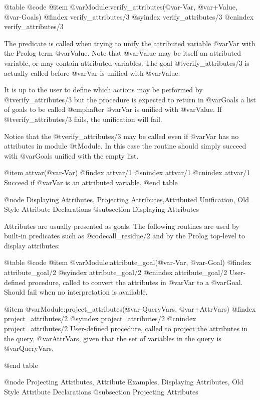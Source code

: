 {{{{{{{{@table @code
@item @var{Module}:verify_attributes(@var{-Var}, @var{+Value}, @var{-Goals})
@findex verify_attributes/3
@syindex verify_attributes/3
@cnindex verify_attributes/3

The predicate is called when trying to unify the attributed variable
@var{Var} with the Prolog term @var{Value}. Note that @var{Value} may be
itself an attributed variable, or may contain attributed variables.  The
goal @t{verify_attributes/3} is actually called before @var{Var} is
unified with @var{Value}.

It is up to the user to define which actions may be performed by
@t{verify_attributes/3} but the procedure is expected to return in
@var{Goals} a list of goals to be called @emph{after} @var{Var} is
unified with @var{Value}. If @t{verify_attributes/3} fails, the
unification will fail.

Notice that the @t{verify_attributes/3} may be called even if @var{Var}
has no attributes in module @t{Module}. In this case the routine should
simply succeed with @var{Goals} unified with the empty list.

@item attvar(@var{-Var})
@findex attvar/1
@snindex attvar/1
@cnindex attvar/1
Succeed if @var{Var} is an attributed variable.
@end table



@node Displaying Attributes, Projecting Attributes,Attributed Unification, Old Style Attribute Declarations 
@subsection Displaying Attributes

Attributes are usually presented as goals. The following routines are
used by built-in predicates such as @code{call_residue/2} and by the
Prolog top-level to display attributes:

@table @code
@item @var{Module}:attribute_goal(@var{-Var}, @var{-Goal})
@findex attribute_goal/2
@syindex attribute_goal/2
@cnindex attribute_goal/2
User-defined procedure, called to convert the attributes in @var{Var} to
a @var{Goal}. Should fail when no interpretation is available.

@item @var{Module}:project_attributes(@var{-QueryVars}, @var{+AttrVars})
@findex project_attributes/2
@syindex project_attributes/2
@cnindex project_attributes/2
User-defined procedure, called to project the attributes in the query,
@var{AttrVars}, given that the set of variables in the query is
@var{QueryVars}.

@end table

@node Projecting Attributes, Attribute Examples, Displaying Attributes, Old Style Attribute Declarations
@subsection Projecting Attributes

}}}}}}}}
